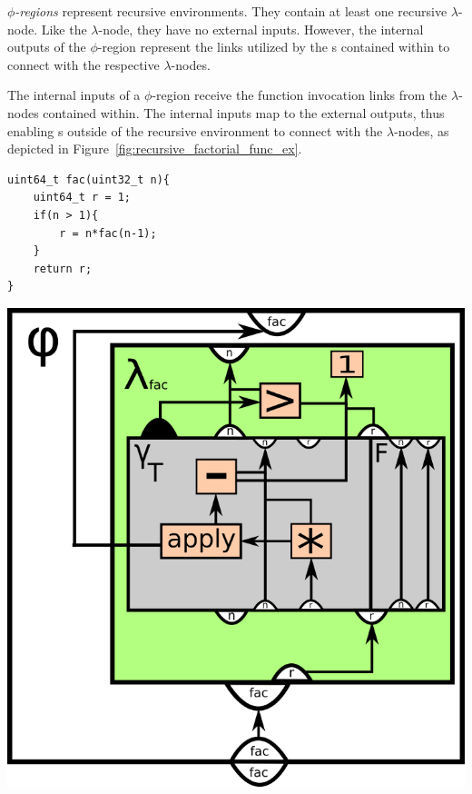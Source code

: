 \begin{itemize}
\textit{$\phi$-regions} represent recursive environments. They contain at least
one recursive $\lambda$-node. Like the $\lambda$-node, they have no external
inputs. However, the internal outputs of the $\phi$-region represent the links
utilized by the \applyNode s contained within to connect with the respective
$\lambda$-nodes.

The internal inputs of a $\phi$-region receive the function invocation links
from the $\lambda$-nodes contained within. The internal inputs map to the
external outputs, thus enabling \applyNode s outside of the recursive
environment to connect with the $\lambda$-nodes, as depicted in
Figure~\ref{fig:recursive_factorial_func_ex}.

\begin{centering}
	\noindent\begin{minipage}{0.37\textwidth}
		\begin{CenteredBox}
		\begin{lstlisting}[label={lst:recursive_factorial_func_ex},
style=minipage_customcpp, basicstyle=\fontsize{10}{1}]
uint64_t fac(uint32_t n){
	uint64_t r = 1;
	if(n > 1){
		r = n*fac(n-1);
	}
	return r;
}
		\end{lstlisting}
		\end{CenteredBox}
	\end{minipage}
	\noindent\begin{minipage}{0.55\textwidth}
		\captionsetup{type=figure}
		\includegraphics[width=\textwidth]{figures/svg/recursive_factorial_func_ex}
	\end{minipage}
	\label{fig:recursive_factorial_func_ex}
\end{centering}

\end{itemize}
